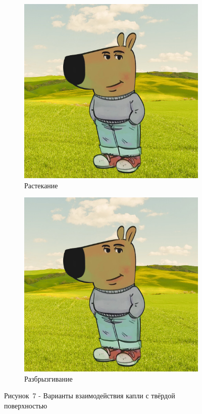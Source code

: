 \begin{figure}[H]
	\begin{subfigure}[t]{0.45\textwidth}
		\centering
		\includegraphics[width=\textwidth]{figures/chill-guy.jpeg}
		\caption{Растекание}
		\label{fig:sub3}
	\end{subfigure}
	\hfill
	\begin{subfigure}[t]{0.45\textwidth}
		\centering
		\includegraphics[width=\textwidth]{figures/chill-guy.jpeg}
		\caption{Разбрызгивание}
		\label{fig:sub4}
	\end{subfigure}
	
	\caption*{Рисунок~7 - Варианты взаимодействия капли с твёрдой поверхностью}
	\label{fig:4grid}
\end{figure}

